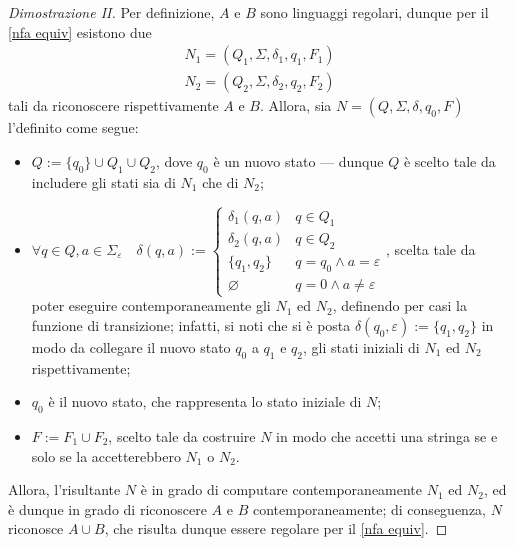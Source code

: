 \documentclass[a4paper, 12pt]{report}
\begin{document}
    \begin{proof}[Dimostrazione II]
        Per definizione, $A$ e $B$ sono linguaggi regolari, dunque per il \cref{nfa equiv} esistono due \NFA $$\left. \begin{array}{c}N_1 = (Q_1, \Sigma, \delta_1, q_1, F_1) \\ N_2 = (Q_2, \Sigma, \delta_2, q_2, F_2) \end{array} \right.$$ tali da riconoscere rispettivamente $A$ e $B$. Allora, sia $N = (Q, \Sigma, \delta, q_0, F)$ l'\NFA definito come segue:

        \begin{itemize}
            \item $Q := \{q_0\} \cup Q_1 \cup Q_2$, dove $q_0$ è un nuovo stato --- dunque $Q$ è scelto tale da includere gli stati sia di $N_1$ che di $N_2$;
            \item $\forall q \in Q, a \in \Sigma_{\varepsilon} \quad \delta(q, a) := \left \{ \begin{array}{ll} \delta_1(q, a) & q \in Q_1 \\ \delta_2(q, a) & q \in Q_2 \\ \{q_1, q_2\} & q = q_0 \land a = \varepsilon \\ \varnothing & q = 0 \land a \neq \varepsilon \end{array} \right.$, scelta tale da poter eseguire contemporaneamente gli \NFA $N_1$ ed $N_2$, definendo per casi la funzione di transizione; infatti, si noti che si è posta $\delta(q_0, \varepsilon) := \{q_1, q_2\}$ in modo da collegare il nuovo stato $q_0$ a $q_1$ e $q_2$, gli stati iniziali di $N_1$ ed $N_2$ rispettivamente;
            \item $q_0$ è il nuovo stato, che rappresenta lo stato iniziale di $N$;
            \item $F := F_1 \cup F_2$, scelto tale da costruire $N$ in modo che accetti una stringa se e solo se la accetterebbero $N_1$ o $N_2$.
        \end{itemize}


        Allora, l'\NFA risultante $N$ è in grado di computare contemporaneamente $N_1$ ed $N_2$, ed è dunque in grado di riconoscere $A$ e $B$ contemporaneamente; di conseguenza, $N$ riconosce $A \cup B$, che risulta dunque essere regolare per il \cref{nfa equiv}.
    \end{proof}
\end{document}
